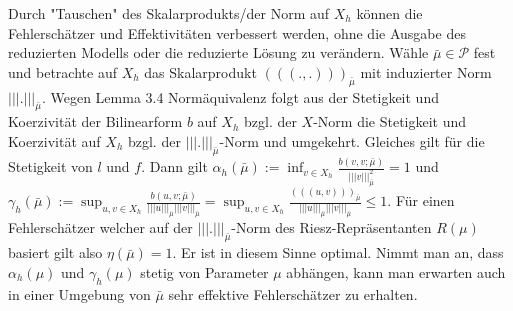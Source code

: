 Durch "Tauschen" des Skalarprodukts/der Norm auf $X_h$ können die Fehlerschätzer und Effektivitäten verbessert werden, ohne die Ausgabe des reduzierten Modells oder die reduzierte Lösung zu verändern.
Wähle $\bar{\mu}\in\mathcal{P}$ fest und betrachte auf $X_h$ das Skalarprodukt $(((.,.)))_{\bar{\mu}}$ mit induzierter Norm $|||.|||_{\bar{\mu}}$.
Wegen Lemma 3.4 Normäquivalenz folgt aus der Stetigkeit und Koerzivität der Bilinearform $b$ auf $X_h$ bzgl. der $X$-Norm die Stetigkeit und Koerzivität auf $X_h$ bzgl. der $|||.|||_{\bar{\mu}}$-Norm und umgekehrt.
Gleiches gilt für die Stetigkeit von $l$ und $f$.
Dann gilt $\alpha_h(\bar{\mu}) := \inf_{v\in X_h} \frac{b(v,v;\bar{\mu})}{|||v|||_{\bar{\mu}}^2} = 1$ und $\gamma_h(\bar{\mu}) := \sup_{u,v\in X_h} \frac{b(u,v;\bar{\mu})}{|||u|||_{\bar{\mu}}|||v|||_{\bar{\mu}}}  = \sup_{u,v\in X_h} \frac{(((u,v)))_{\bar{\mu}}}{|||u|||_{\bar{\mu}}|||v|||_{\bar{\mu}}} \le 1$.
Für einen Fehlerschätzer welcher auf der $|||.|||_{\bar{\mu}}$-Norm des Riesz-Repräsentanten $R(\mu)$ basiert gilt also $\eta(\bar{\mu})=1$.
Er ist in diesem Sinne optimal.
Nimmt man an, dass $\alpha_h(\mu)$ und $\gamma_h(\mu)$ stetig von Parameter $\mu$ abhängen, kann man erwarten auch in einer Umgebung von $\bar{\mu}$ sehr effektive Fehlerschätzer zu erhalten.

